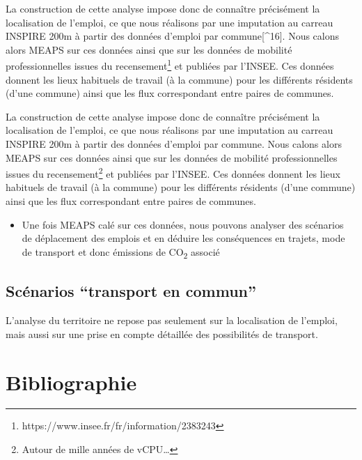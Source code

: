 \documentclass[
  10pt,
  a4paper,
  numbers=noendperiod,
  DIV=12]{scrartcl}
\providecommand{\tightlist}{%
  \setlength{\itemsep}{0pt}\setlength{\parskip}{0pt}}\usepackage{longtable,booktabs,array}
\begin{document}
La construction de cette analyse impose donc de connaître précisément la
localisation de l'emploi, ce que nous réalisons par une imputation au
carreau INSPIRE 200m à partir des données d'emploi par
commune{[}\^{}16{]}. Nous calons alors MEAPS sur ces données ainsi que
sur les données de mobilité professionnelles issues du
recensement\footnote{https://www.insee.fr/fr/information/2383243} et
publiées par l'INSEE. Ces données donnent les lieux habituels de travail
(à la commune) pour les différents résidents (d'une commune) ainsi que
les flux correspondant entre paires de communes.

La construction de cette analyse impose donc de connaître précisément la
localisation de l'emploi, ce que nous réalisons par une imputation au
carreau INSPIRE 200m à partir des données d'emploi par commune. Nous
calons alors MEAPS sur ces données ainsi que sur les données de mobilité
professionnelles issues du recensement\footnote{Autour de mille années
  de vCPU\ldots{}} et publiées par l'INSEE. Ces données donnent les
lieux habituels de travail (à la commune) pour les différents résidents
(d'une commune) ainsi que les flux correspondant entre paires de
communes.

\begin{itemize}
\tightlist
\item
  Une fois MEAPS calé sur ces données, nous pouvons analyser des
  scénarios de déplacement des emplois et en déduire les conséquences en
  trajets, mode de transport et donc émissions de CO\textsubscript{2}
  associé
\end{itemize}

\hypertarget{scuxe9narios-transport-en-commun}{%
\subsection{Scénarios ``transport en
commun''}\label{scuxe9narios-transport-en-commun}}

L'analyse du territoire ne repose pas seulement sur la localisation de
l'emploi, mais aussi sur une prise en compte détaillée des possibilités
de transport.

\newpage{}

\hypertarget{bibliographie}{%
\section*{Bibliographie}\label{bibliographie}}
\end{document}
